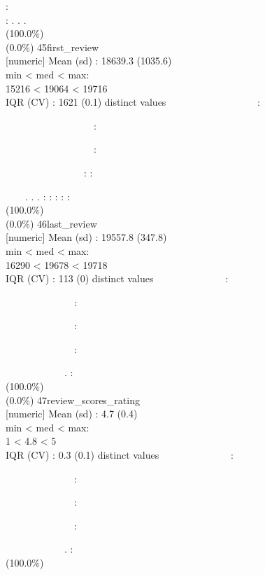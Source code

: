 \documentclass[
  journal,
]{IEEEtran}%
\begin{document}
:\\
: . . . \\
(100.0\%) \\
(0.0\%) \textbar{} \textbar{} 45\textbar first\_review\\
{[}numeric{]} \textbar Mean (sd) : 18639.3 (1035.6)\\
min \textless{} med \textless{} max:\\
15216 \textless{} 19064 \textless{} 19716\\
IQR (CV) : 1621 (0.1)  distinct values \textbar{}
\textbar~~~~~~~~~~~~~~~~~~:\\
\strut ~~~~~~~~~~~~~~~~~~:\\
\strut ~~~~~~~~~~~~~~~~~~:\\
\strut ~~~~~~~~~~~~~~~~: :\\
\strut ~~~~. . . : : : : : \\
(100.0\%) \\
(0.0\%) \textbar{} \textbar{} 46\textbar last\_review\\
{[}numeric{]} \textbar Mean (sd) : 19557.8 (347.8)\\
min \textless{} med \textless{} max:\\
16290 \textless{} 19678 \textless{} 19718\\
IQR (CV) : 113 (0)  distinct values \textbar{}
\textbar~~~~~~~~~~~~~~:\\
\strut ~~~~~~~~~~~~~~:\\
\strut ~~~~~~~~~~~~~~:\\
\strut ~~~~~~~~~~~~~~:\\
\strut ~~~~~~~~~~~~. : \\
(100.0\%) \\
(0.0\%) \textbar{} \textbar{} 47\textbar review\_scores\_rating\\
{[}numeric{]} \textbar Mean (sd) : 4.7 (0.4)\\
min \textless{} med \textless{} max:\\
1 \textless{} 4.8 \textless{} 5\\
IQR (CV) : 0.3 (0.1)  distinct values \textbar{}
\textbar~~~~~~~~~~~~~~:\\
\strut ~~~~~~~~~~~~~~:\\
\strut ~~~~~~~~~~~~~~:\\
\strut ~~~~~~~~~~~~~~:\\
\strut ~~~~~~~~~~~~. : \\
(100.0\%) \\
\end{document}
